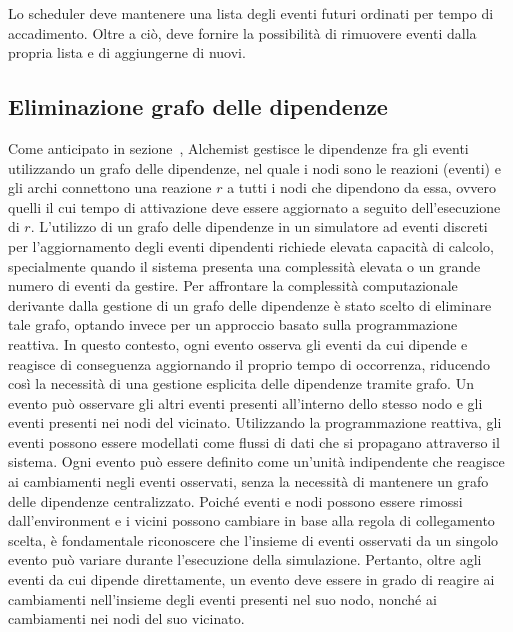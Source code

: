 \documentclass[12pt,a4paper,openright,twoside]{book}
\begin{document}
Lo scheduler deve mantenere una lista degli eventi futuri ordinati per tempo di accadimento. Oltre a ciò, deve fornire la possibilità di rimuovere eventi dalla propria lista e di aggiungerne di nuovi. 

\subsection{Eliminazione grafo delle dipendenze}
Come anticipato in sezione~, Alchemist gestisce le dipendenze fra gli eventi utilizzando un grafo delle dipendenze, nel quale i nodi sono le reazioni (eventi) e gli archi connettono una reazione $r$ a tutti i nodi che dipendono da essa, ovvero quelli il cui tempo di attivazione deve essere aggiornato a seguito dell'esecuzione di $r$. 
L'utilizzo di un grafo delle dipendenze in un simulatore ad eventi discreti per l'aggiornamento degli eventi dipendenti richiede elevata capacità di calcolo, specialmente quando il sistema presenta una complessità elevata o un grande numero di eventi da gestire.
Per affrontare la complessità computazionale derivante dalla gestione di un grafo delle dipendenze è stato scelto di eliminare tale grafo, optando invece per un approccio basato sulla programmazione reattiva. In questo contesto, ogni evento osserva gli eventi da cui dipende e reagisce di conseguenza aggiornando il proprio tempo di occorrenza, riducendo così la necessità di una gestione esplicita delle dipendenze tramite grafo. Un evento può osservare gli altri eventi presenti all'interno dello stesso nodo e gli eventi presenti nei nodi del vicinato. 
Utilizzando la programmazione reattiva, gli eventi possono essere modellati come flussi di dati che si propagano attraverso il sistema. Ogni evento può essere definito come un'unità indipendente che reagisce ai cambiamenti negli eventi osservati, senza la necessità di mantenere un grafo delle dipendenze centralizzato. 
Poiché eventi e nodi possono essere rimossi dall'environment e i vicini possono cambiare in base alla regola di collegamento scelta, è fondamentale riconoscere che l'insieme di eventi osservati da un singolo evento può variare durante l'esecuzione della simulazione. Pertanto, oltre agli eventi da cui dipende direttamente, un evento deve essere in grado di reagire ai cambiamenti nell'insieme degli eventi presenti nel suo nodo, nonché ai cambiamenti nei nodi del suo vicinato.  
\end{document}
